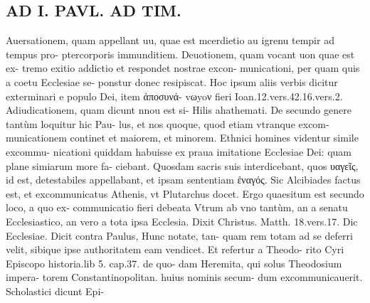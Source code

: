 \documentclass{article}
\begin{document}
\begin{pages}
\section*{AD I. PAVL. AD TIM. }
\marginpar{[ p.392 ]} Auersationem, quam appellant uu, quae est mcerdietio au igrenu tempir ad tempus pro- ptercorporis immunditiem.  \pend{} Deuotionem, quam vocant uon quae est ex- tremo exitio addictio et respondet nostrae excon- municationi, per quam quis a coetu Ecclesiae se- ponstur donec resipiscat. Hoc ipsum aliis verbis dicitur exterminari e populo Dei, item ἀποσυνά- vωyoν fieri Ioan.12.vers.42.16.vers.2.  \pend\pstart Adiudicationem, quam dicunt nnou est si- Hilis ahathemati.  \pend\pstart De secundo genere tantùm loquitur hic Pau- lus, et nos quoque, quod etiam vtranque excom- municationem continet et maiorem, et minorem.  \pend\pstart Ethnici homines videntur simile excommu- nicationi quiddam habuisse ex praua imitatione Ecclesiae Dei: quam plane simiarum more fa- ciebant. Quosdam sacris suis interdicebant, quos υαγεῖς, id est, detestabiles appellabant, et ipsam sententiam ἐναγός. Sic Alcibiades factus est, et excommunicatus Athenis, vt Plutarchus docet.  \pend\pstart Ergo quaesitum est secundo loco, a quo ex- communicatio fieri debeata Vtrum ab vno tantùm, an a senatu Ecclesiastico, an vero a tota ipsa Ecclesia. Dixit Christus. Matth. 18.vers.17. Dic Ecclesiae. Dicit contra Paulus, Hunc notate, tan- quam rem totam ad se deferri velit, sibique ipse authoritatem eam vendicet. Et refertur a Theodo- rito Cyri Episcopo historia.lib 5. cap.37. de quo- dam Heremita, qui solus Theodosium impera- torem Constantinopolitan. huius nominis secum- dum excommunicauerit. Scholastici dicunt Epi-  \pend

\end{pages}
\end{document}
